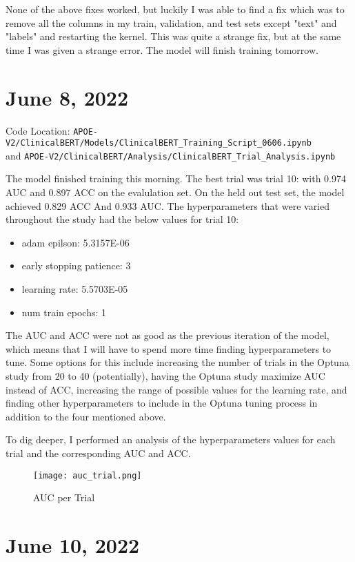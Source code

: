 \documentclass[11pt,letterpaper]{article}
\begin{document}
None of the above fixes worked, but luckily I was able to find a fix which was to remove all the columns in my train, validation, and test sets except "text" and "labels" and restarting the kernel. This was quite a strange fix, but at the same time I was given a strange error. The model will finish training tomorrow. 

\section{June 8, 2022}

Code Location: \texttt{APOE-V2/ClinicalBERT/Models/ClinicalBERT\_Training\_Script\_0606.ipynb} \\ and \texttt{APOE-V2/ClinicalBERT/Analysis/ClinicalBERT\_Trial\_Analysis.ipynb}

The model finished training this morning. The best trial was trial 10: with 0.974 AUC and 0.897 ACC on the evalulation set. On the held out test set, the model achieved 0.829 ACC And 0.933 AUC. The hyperparameters that were varied throughout the study had the below values for trial 10:

\begin{itemize}
   \item adam epilson: 5.3157E-06
   \item early stopping patience: 3
   \item learning rate: 5.5703E-05
   \item num train epochs: 1
\end{itemize}

The AUC and ACC were not as good as the previous iteration of the model, which means that I will have to spend more time finding hyperparameters to tune. Some options for this include increasing the number of trials in the Optuna study from 20 to 40 (potentially), having the Optuna study maximize AUC instead of ACC, increasing the range of possible values for the learning rate, and finding other hyperparameters to include in the Optuna tuning process in addition to the four mentioned above. 

To dig deeper, I performed an analysis of the hyperparameters values for each trial and the corresponding AUC and ACC. 

\begin{figure}[ht!]
\centering
\texttt{[image: auc\_trial.png]}
\caption{AUC per Trial}
\end{figure}

\section{June 10, 2022}
\end{document}
